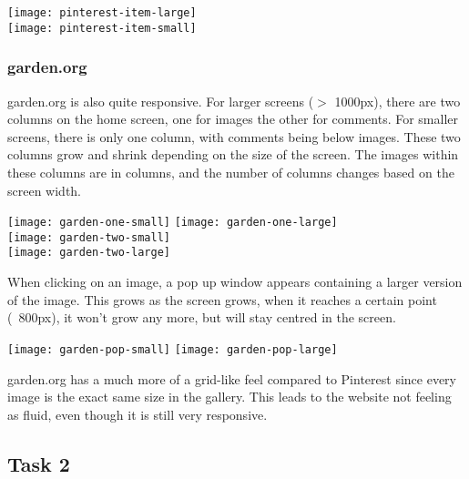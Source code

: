 \documentclass[portfolio.tex.tex]{subfiles}
\begin{document}
					\begin{center}
						\texttt{[image: pinterest-item-large]}\\
						\texttt{[image: pinterest-item-small]}
					\end{center}

				\subsubsection{garden.org}
					garden.org is also quite responsive. For larger screens ($>$ 1000px), there are two columns on the home screen, one for images  the other for comments. For smaller screens, there is only one column, with comments being below images. These two columns grow and shrink depending on the size of the screen. The images within these columns are in columns, and the number of columns changes based on the screen width.

					\begin{center}
						\texttt{[image: garden-one-small]}
						\vspace{1cm}
						\texttt{[image: garden-one-large]}\\
						\vspace{1cm}
						\texttt{[image: garden-two-small]}\\
						\vspace{1cm}
						\texttt{[image: garden-two-large]}\\
					\end{center}

					When clicking on an image, a pop up window appears containing a larger version of the image. This grows as the screen grows, when it reaches a certain point (~800px), it won't grow any more, but will stay centred in the screen.

					\begin{center}
						\texttt{[image: garden-pop-small]}
						\texttt{[image: garden-pop-large]}
					\end{center}

					garden.org has a much more of a grid-like feel compared to Pinterest since every image is the exact same size in the gallery. This leads to the website not feeling as fluid, even though it is still very responsive.

			\subsection{Task 2}
\end{document}
